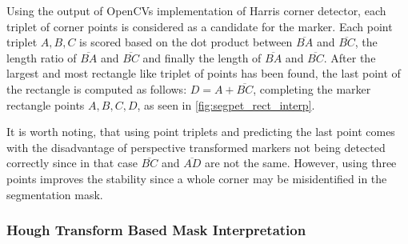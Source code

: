 \documentclass[10pt]{book}
\newcommand{\figureref}[1]{\autoref{#1}}
\begin{document}
Using the output of \acp{OpenCV} implementation of Harris corner detector, each triplet of corner points is considered as a candidate for the marker. Each point triplet $A,B,C$ is scored based on the dot product between $\overline{BA}$ and $\overline{BC}$, the length ratio of $\overline{BA}$ and $\overline{BC}$ and finally the length of $\overline{BA}$ and $\overline{BC}$. After the largest and most rectangle like triplet of points has been found, the last point of the rectangle is computed as follows: $D = A + \overline{BC}$, completing the marker rectangle points $A,B,C,D$, as seen in \figureref{fig:segpet_rect_interp}. 

It is worth noting, that using point triplets and predicting the last point comes with the disadvantage of perspective transformed markers not being detected correctly since in that case $\overline{BC}$ and $\overline{AD}$ are not the same. However, using three points improves the stability since a whole corner may be misidentified in the segmentation mask.


\subsubsection{Hough Transform Based Mask Interpretation}
\end{document}
